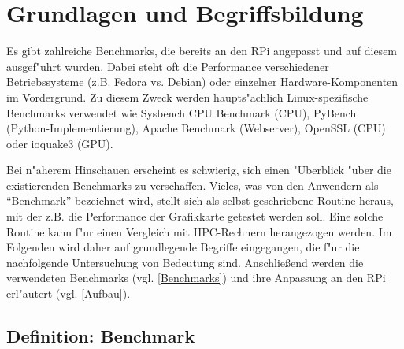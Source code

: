 \chapter{Grundlagen und Begriffsbildung}\label{Kapitel 2}

Es gibt zahlreiche Benchmarks, die bereits an den RPi angepasst und auf diesem ausgef"uhrt wurden. Dabei steht oft die Performance verschiedener Betriebssysteme (z.B. Fedora vs. Debian) oder einzelner Hardware-Komponen\-ten im Vordergrund. Zu diesem Zweck werden haupts"achlich Linux-spezifische Benchmarks verwendet wie Sysbench CPU Benchmark (CPU), PyBench (Python-Implementierung), Apache Benchmark (Webserver), Open\-SSL (CPU) oder ioquake3 (GPU). 

Bei n"aherem Hinschauen erscheint es schwierig, sich einen "Uberblick "uber die existierenden Benchmarks zu verschaffen. Vieles, was von den Anwendern als "`Benchmark"' bezeichnet wird, stellt sich als selbst geschriebene Routine heraus, mit der z.B. die Performance der Grafikkarte getestet werden soll. Eine solche Routine kann f"ur einen Vergleich mit HPC-Rechnern herangezogen werden. Im Folgenden wird daher auf grundlegende Begriffe eingegangen, die f"ur die nachfolgende Untersuchung von Bedeutung sind. Anschlie\ss end werden die verwendeten Benchmarks (vgl. \ref{Benchmarks}) und ihre Anpassung an den RPi erl"autert (vgl. \ref{Aufbau}). 

\section{Definition: Benchmark}\label{Benchmarking}

